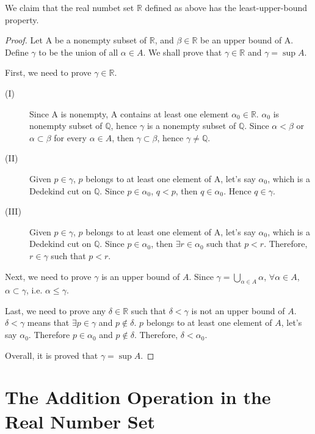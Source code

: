 \documentclass[onecolumn]{article}
\begin{document}
We claim that the real numbet set $\mathbb{R}$ defined as above has the 
least-upper-bound property.
\begin{proof}
  Let A be a nonempty subset of $\mathbb{R}$, and $\beta \in \mathbb{R}$ be an 
  upper bound of A. Define $\gamma$ to be the union of all $\alpha \in A$. We 
  shall prove that $\gamma \in \mathbb{R}$ and $\gamma = \sup A$.

  First, we need to prove $\gamma \in \mathbb{R}$.
  \begin{description}
    \item[(I)] Since A is nonempty, A contains at least one element 
    $\alpha_0 \in \mathbb{R}$. $\alpha_0$ is nonempty subset of $\mathbb{Q}$, 
    hence $\gamma$ is a nonempty subset of $\mathbb{Q}$. Since $\alpha < \beta$ 
    or $\alpha \subset \beta$ for every $\alpha \in A$, then 
    $\gamma \subset \beta$, hence $\gamma \neq \mathbb{Q}$.
    \item[(II)] Given $p \in \gamma$, $p$ belongs to at least one element of A, 
    let's say $\alpha_0$, which is a Dedekind cut on $\mathbb{Q}$. Since 
    $p \in \alpha_0$, $q < p$, then $q \in \alpha_0$. Hence $q \in \gamma$.
    \item[(III)] Given $p \in \gamma$, $p$ belongs to at least one element of A, 
    let's say $\alpha_0$, which is a Dedekind cut on $\mathbb{Q}$. Since 
    $p \in \alpha_0$, then $\exists r \in \alpha_0$ such that $p < r$. Therefore,
    $r \in \gamma$ such that $p < r$.
  \end{description}

  Next, we need to prove $\gamma$ is an upper bound of $A$. Since 
  $\gamma = \bigcup_{\alpha \in A} \alpha$, $\forall \alpha \in A$, 
  $\alpha \subset \gamma$, i.e. $\alpha \leq \gamma$.

  Last, we need to prove any $\delta \in \mathbb{R}$ such that $\delta < \gamma$ 
  is not an upper bound of $A$. $\delta < \gamma$ means that 
  $\exists p \in \gamma$ and $p \notin \delta$. $p$ belongs to at least one 
  element of $A$, let's say $\alpha_0$. Therefore $p \in \alpha_0$ and 
  $p \notin \delta$. Therefore, $\delta < \alpha_0$.

  Overall, it is proved that $\gamma = \sup A$.
\end{proof}

\section{The Addition Operation in the Real Number Set}
\end{document}
